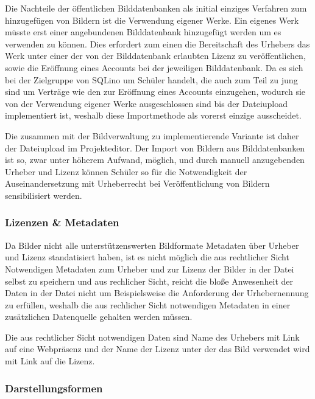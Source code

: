 Die Nachteile der öffentlichen Bilddatenbanken als initial einziges Verfahren
zum hinzugefügen von Bildern ist die Verwendung eigener Werke. Ein eigenes Werk
müsste erst einer angebundenen Bilddatenbank hinzugefügt werden um es verwenden
zu können. Dies erfordert zum einen die Bereitschaft des Urhebers das Werk unter
einer der von der Bilddatenbank erlaubten Lizenz zu veröffentlichen, sowie die
Eröffnung eines Accounts bei der jeweiligen Bilddatenbank. Da es sich bei der
Zielgruppe von SQLino um Schüler handelt, die auch zum Teil zu jung sind um
Verträge wie den zur Eröffnung eines Accounts einzugehen, wodurch sie von der
Verwendung eigener Werke ausgeschlossen sind bis der Dateiupload implementiert
ist, weshalb diese Importmethode als vorerst einzige ausscheidet.


Die zusammen mit der Bildverwaltung zu implementierende Variante ist daher der
Dateiupload im Projekteditor. Der Import von Bildern aus Bilddatenbanken ist so,
zwar unter höherem Aufwand, möglich, und durch manuell anzugebenden Urheber und
Lizenz können Schüler so für die Notwendigkeit der Auseinandersetzung mit
Urheberrecht bei Veröffentlichung von Bildern sensibilisiert werden.

\subsubsection{Lizenzen \& Metadaten}

Da Bilder nicht alle unterstützenswerten Bildformate Metadaten über
Urheber und Lizenz standatisiert haben, ist es nicht möglich die aus
rechtlicher Sicht Notwendigen Metadaten zum Urheber und zur Lizenz der Bilder
in der Datei selbst zu speichern und aus rechlicher Sicht, reicht die bloße
Anwesenheit der Daten in der Datei nicht um Beispielsweise die Anforderung der
Urhebernennung zu erfüllen, weshalb die aus rechlicher Sicht notwendigen
Metadaten in einer zusätzlichen Datenquelle gehalten werden müssen.

Die aus rechtlicher Sicht notwendigen Daten sind Name des Urhebers mit Link auf
eine Webpräsenz und der Name der Lizenz unter der das Bild verwendet wird
mit Link auf die Lizenz.

\subsubsection{Darstellungsformen}

